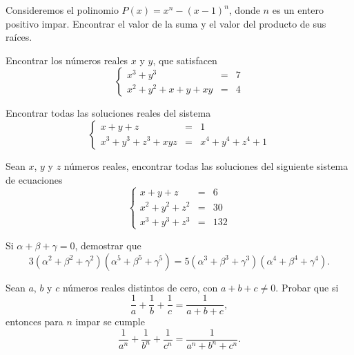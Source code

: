 \begin{multicols}{2}
    \begin{problem}
        Consideremos el polinomio $P(x) = x^n - (x - 1)^n$, donde $n$ es un entero positivo impar.
        Encontrar el valor de la suma y el valor del producto de sus raíces.
    \end{problem}

    \begin{problem}
        Encontrar los números reales $x$ y $y$, que satisfacen
        \[
            \left\{
            \begin{array}{rcl}
                x^3 + y^3 & =& 7\\
                x^2 + y^2 + x + y + xy & =& 4
            \end{array}
            \right.
        \]
    \end{problem}

    \begin{problem}
        Encontrar todas las soluciones reales del sistema
        \[
            \left\{
            \begin{array}{rcl}
                x + y + z & =& 1\\
                x^3 + y^3 + z^3 + xyz & =& x^4 + y^4 + z^4 + 1
            \end{array}
            \right.
        \]
    \end{problem}

    \begin{problem}
        Sean $x$, $y$ y $z$ números reales, encontrar todas las soluciones del siguiente sistema de ecuaciones
        \[
            \left\{
            \begin{array}{rcl}
                x + y + z & =& 6\\
                x^2 + y^2 + z^2 & =& 30\\
                x^3 + y^3 + z^3 & =& 132
            \end{array}
            \right.
        \]
    \end{problem}

    \begin{problem}
        Si $\alpha + \beta + \gamma = 0$, demostrar que
        \[3 (\alpha^2 + \beta^2 + \gamma^2) (\alpha^5 + \beta^5 + \gamma^5) = 5 (\alpha^3 + \beta^3 + \gamma^3) (\alpha^4 + \beta^4 + \gamma^4).\]
    \end{problem}

    \begin{problem}
        Sean $a$, $b$ y $c$ números reales distintos de cero, con $a + b + c \neq 0$.
        Probar que si
        \[\frac{1}{a} + \frac{1}{b} + \frac{1}{c} = \frac{1}{a + b + c},\]
        entonces para $n$ impar se cumple
        \[\frac{1}{a^n} + \frac{1}{b^n} + \frac{1}{c^n} = \frac{1}{a^n + b^n + c^n}.\]
    \end{problem}
\end{multicols}